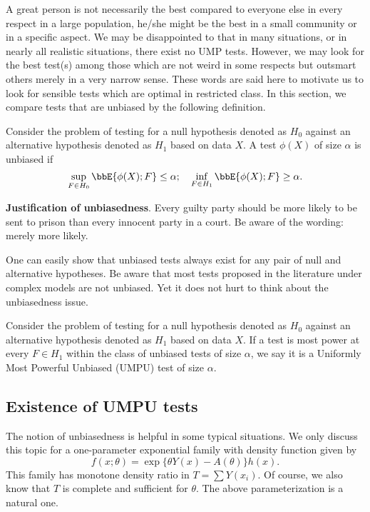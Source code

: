 A great person is not necessarily the best compared to
everyone else in every respect in a large population,
he/she might be the best in a small community or in a specific
aspect.
We may be disappointed to that in many situations, or in
nearly all realistic situations, there exist no UMP tests.
However, we may look for the best test(s) among those
which are not weird in some respects but outsmart others
merely in a very narrow sense.
These words are said here to motivate us to look for
sensible tests which are optimal in restricted class. 
In this section, we compare tests that are unbiased
by the following definition.

\begin{defi}
Consider the problem of testing for a null hypothesis
denoted as $H_0$ against an alternative hypothesis denoted
as $H_1$ based on data $X$.
A test $\phi(X)$ of size $\alpha$ is unbiased if
\[
\sup_{F \in H_0} \bbE\{ \phi(X); F\} \leq \alpha;
~~~
\inf_{F \in H_1} \bbE\{ \phi(X); F\} \geq \alpha.
\]
\end{defi}

\vs\no
{\bf Justification of unbiasedness}.
Every guilty party should be more likely to be sent to
prison than every innocent party in a court.
Be aware of the wording: merely more likely.

One can easily show that unbiased tests always exist
for any pair of null and alternative hypotheses.
Be aware that most tests proposed in the literature
under complex models are not unbiased.
Yet it does not hurt to think about the unbiasedness
issue. 

\begin{defi}
Consider the problem of testing for a null hypothesis
denoted as $H_0$ against an alternative hypothesis denoted
as $H_1$ based on data $X$.
If a test is most power at every $F \in H_1$ within
the class of unbiased tests of size $\alpha$,
we say it is a Uniformly Most Powerful Unbiased (UMPU) test
of size $\alpha$.
\end{defi}

\subsection{Existence of UMPU tests}
The notion of unbiasedness is helpful in some typical situations.
We only discuss this topic for a one-parameter exponential family
with density function given by
\[
f(x; \theta) = \exp \{ \theta Y(x) - A(\theta)\} h(x).
\]
This family has monotone density ratio in $T = \sum Y(x_i)$.
Of course, we also know that $T$ is complete and sufficient for $\theta$.
The above parameterization is a natural one.

